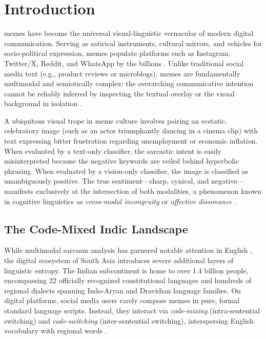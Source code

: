 \documentclass[10pt,journal,compsoc]{IEEEtran}
\begin{document}
\maketitle
\IEEEdisplaynontitleabstractindextext
\IEEEpeerreviewmaketitle

\section{Introduction}
 memes have become the universal visual-linguistic vernacular of modern digital communication. Serving as satirical instruments, cultural mirrors, and vehicles for socio-political expression, memes populate platforms such as Instagram, Twitter/X, Reddit, and WhatsApp by the billions \cite{kiela2020hateful, sharma2020semeval}. Unlike traditional social media text (e.g., product reviews or microblogs), memes are fundamentally multimodal and semiotically complex: the overarching communicative intention cannot be reliably inferred by inspecting the textual overlay or the visual background in isolation \cite{baltruvsaitis2018multimodal, poria2020beneath}. 

A ubiquitous visual trope in meme culture involves pairing an ecstatic, celebratory image (such as an actor triumphantly dancing in a cinema clip) with text expressing bitter frustration regarding unemployment or economic inflation. When evaluated by a text-only classifier, the sarcastic intent is easily misinterpreted because the negative keywords are veiled behind hyperbolic phrasing. When evaluated by a vision-only classifier, the image is classified as unambiguously positive. The true sentiment—sharp, cynical, and negative—manifests exclusively at the intersection of both modalities, a phenomenon known in cognitive linguistics as \textit{cross-modal incongruity} or \textit{affective dissonance} \cite{pramanick2021detecting, bhandari2022meme}.

\subsection{The Code-Mixed Indic Landscape}
While multimodal sarcasm analysis has garnered notable attention in English \cite{kiela2020hateful, tsai2019multimodal}, the digital ecosystem of South Asia introduces severe additional layers of linguistic entropy. The Indian subcontinent is home to over 1.4 billion people, encompassing 22 officially recognized constitutional languages and hundreds of regional dialects spanning Indo-Aryan and Dravidian language families. On digital platforms, social media users rarely compose memes in pure, formal standard language scripts. Instead, they interact via \textit{code-mixing} (intra-sentential switching) and \textit{code-switching} (inter-sentential switching), interspersing English vocabulary with regional words \cite{bali2014borrowing, chandra2021subword}. 
\end{document}
